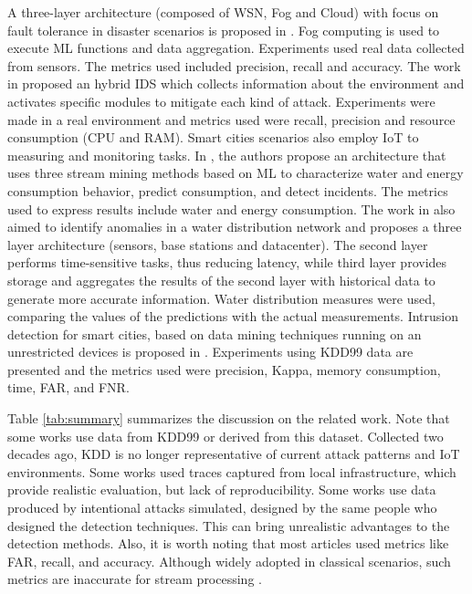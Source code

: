 A three-layer architecture (composed of WSN, Fog and Cloud) with focus on fault tolerance in disaster scenarios is proposed in \cite{Fault-tolerance-disaster}. Fog computing is used to execute ML functions and data aggregation. Experiments used real data collected from sensors. The metrics used included precision, recall and accuracy.
%
The work in \cite{Kalis} proposed an hybrid IDS which collects information about the environment and activates specific modules to mitigate each kind of attack. Experiments were made in a real environment and metrics used were recall, precision and resource consumption (CPU and RAM).
%
Smart cities scenarios also employ IoT to measuring and monitoring tasks. %
In \cite{IoT-arch-smartmeter}, the authors propose an architecture that uses three stream mining methods based on ML to characterize water and energy consumption behavior, predict consumption, and detect incidents. The metrics used to express results include water and energy consumption.
%
The work in \cite{scalable-anomaly-detection-smart-city} also aimed to identify anomalies in a water distribution network and proposes a three layer architecture (sensors, base stations and datacenter). The second layer performs time-sensitive tasks, thus reducing latency, while third layer provides storage and aggregates the results of the second layer with historical data to generate more accurate information.
Water distribution measures were used, comparing the values of the predictions with the actual measurements.
%
Intrusion detection for smart cities, based on data mining techniques running on an unrestricted devices is proposed in  \cite{DS-based-IDS-SmartGrid}. 
Experiments using KDD99 data are presented and the metrics used were precision, Kappa, memory consumption, time, FAR, and FNR.


Table \ref{tab:summary} summarizes the discussion on the related work.
Note that some works use data from KDD99 or derived from this dataset. Collected two decades ago, KDD is no longer representative of current attack patterns and IoT environments.
Some works used traces captured from local infrastructure, which provide realistic evaluation, but lack of reproducibility.
Some works use data produced by intentional attacks simulated, designed by the same people who designed the detection techniques. This can bring unrealistic advantages to the detection methods.
Also, it is worth noting that most articles used metrics like FAR, recall, and accuracy. Although widely adopted in classical scenarios, such metrics are inaccurate for stream processing  \cite{GAMA2010}.


